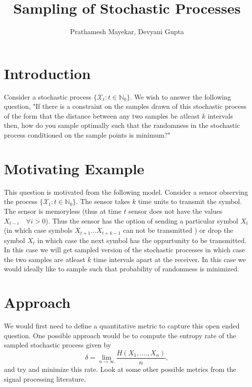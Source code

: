 \documentclass[a4paper,english,12pt]{article}
\title{Sampling of Stochastic Processes}
\author{Prathamesh Mayekar, Devyani Gupta }
\begin{document}
\maketitle 


\section{Introduction}
Consider a stochastic process $\{\mathcal{X}_t: t \in \mathbb{N}_0\}$. We wish to answer the following question, "If there is a constraint on the samples drawn of this stochastic process of the form that the distance between any two samples be atleast $k$ intervals then, how do you sample optimally such that the randomness in the stochastic process conditioned on the sample points is minimum?"



\section{Motivating Example}
This question is motivated from the following model. Consider a sensor observing the process $\{\mathcal{X}_t: t \in \mathbb{N}_0\}$. The sensor takes $k$ time units to transmit the symbol. The sensor is memoryless (thus at time  $t$ sensor does not have the values $X_{t-i} \quad \forall i >0 $). Thus the sensor has the option of sending a particular symbol $X_t$ (in which case symbols $X_{t+1}$...$X_{t+k-1}$ can not be transmitted ) or drop the symbol $X_t$ in which case the next symbol has the oppurtunity to be transmitted. In this case we will get sampled version of the stochastic processes in which case the two samples are atleast $k$ time intervals apart at the receiver. In this case we would ideally like to sample such that probability of randomness is minimized.

\section{Approach}
We would first need to define a quantitative metric to capture this open ended question. One possible approach would be to compute the entropy rate of the sampled stochastic process given by $$\delta=\lim_{n \rightarrow \infty} \frac{H(X_1,...., X_n)}{n},$$ and try and minimize this rate.
Look at some other possible metrics from the signal processing literature.
\end{document}
